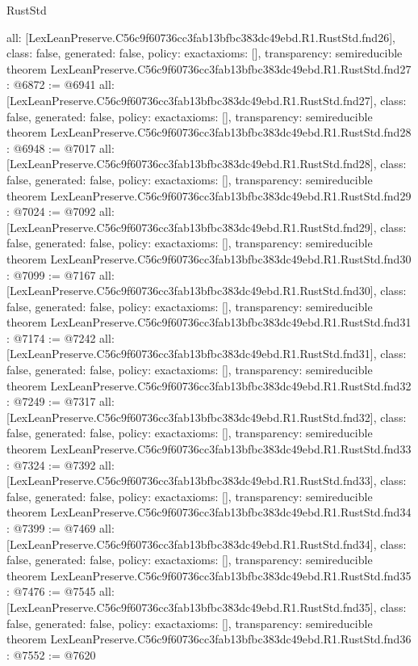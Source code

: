 \begin{lexlean}{RustStd}
\begin{coremodule}
{  all: [LexLeanPreserve.C56c9f60736cc3fab13bfbc383dc49ebd.R1.RustStd.fnd26],
  class: false,
  generated: false,
  policy: exact{axioms: []},
  transparency: semireducible
}
theorem LexLeanPreserve.C56c9f60736cc3fab13bfbc383dc49ebd.R1.RustStd.fnd27 : @6872 := @6941 {
  all: [LexLeanPreserve.C56c9f60736cc3fab13bfbc383dc49ebd.R1.RustStd.fnd27],
  class: false,
  generated: false,
  policy: exact{axioms: []},
  transparency: semireducible
}
theorem LexLeanPreserve.C56c9f60736cc3fab13bfbc383dc49ebd.R1.RustStd.fnd28 : @6948 := @7017 {
  all: [LexLeanPreserve.C56c9f60736cc3fab13bfbc383dc49ebd.R1.RustStd.fnd28],
  class: false,
  generated: false,
  policy: exact{axioms: []},
  transparency: semireducible
}
theorem LexLeanPreserve.C56c9f60736cc3fab13bfbc383dc49ebd.R1.RustStd.fnd29 : @7024 := @7092 {
  all: [LexLeanPreserve.C56c9f60736cc3fab13bfbc383dc49ebd.R1.RustStd.fnd29],
  class: false,
  generated: false,
  policy: exact{axioms: []},
  transparency: semireducible
}
theorem LexLeanPreserve.C56c9f60736cc3fab13bfbc383dc49ebd.R1.RustStd.fnd30 : @7099 := @7167 {
  all: [LexLeanPreserve.C56c9f60736cc3fab13bfbc383dc49ebd.R1.RustStd.fnd30],
  class: false,
  generated: false,
  policy: exact{axioms: []},
  transparency: semireducible
}
theorem LexLeanPreserve.C56c9f60736cc3fab13bfbc383dc49ebd.R1.RustStd.fnd31 : @7174 := @7242 {
  all: [LexLeanPreserve.C56c9f60736cc3fab13bfbc383dc49ebd.R1.RustStd.fnd31],
  class: false,
  generated: false,
  policy: exact{axioms: []},
  transparency: semireducible
}
theorem LexLeanPreserve.C56c9f60736cc3fab13bfbc383dc49ebd.R1.RustStd.fnd32 : @7249 := @7317 {
  all: [LexLeanPreserve.C56c9f60736cc3fab13bfbc383dc49ebd.R1.RustStd.fnd32],
  class: false,
  generated: false,
  policy: exact{axioms: []},
  transparency: semireducible
}
theorem LexLeanPreserve.C56c9f60736cc3fab13bfbc383dc49ebd.R1.RustStd.fnd33 : @7324 := @7392 {
  all: [LexLeanPreserve.C56c9f60736cc3fab13bfbc383dc49ebd.R1.RustStd.fnd33],
  class: false,
  generated: false,
  policy: exact{axioms: []},
  transparency: semireducible
}
theorem LexLeanPreserve.C56c9f60736cc3fab13bfbc383dc49ebd.R1.RustStd.fnd34 : @7399 := @7469 {
  all: [LexLeanPreserve.C56c9f60736cc3fab13bfbc383dc49ebd.R1.RustStd.fnd34],
  class: false,
  generated: false,
  policy: exact{axioms: []},
  transparency: semireducible
}
theorem LexLeanPreserve.C56c9f60736cc3fab13bfbc383dc49ebd.R1.RustStd.fnd35 : @7476 := @7545 {
  all: [LexLeanPreserve.C56c9f60736cc3fab13bfbc383dc49ebd.R1.RustStd.fnd35],
  class: false,
  generated: false,
  policy: exact{axioms: []},
  transparency: semireducible
}
theorem LexLeanPreserve.C56c9f60736cc3fab13bfbc383dc49ebd.R1.RustStd.fnd36 : @7552 := @7620 {
}
\end{coremodule}
\end{lexlean}
